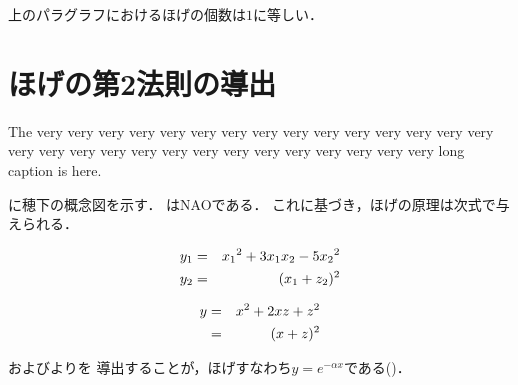 \begin{small}
上のパラグラフにおけるほげの個数は$1$に等しい．
 
 
\section{ほげの第2法則の導出}
 
 
{\baselineskip=9pt The very very very very very very very very very very very very very
very very very very very very very very very very very very very very
very very long caption is here.}
 
に穂下の概念図を示す．
はNAOである．
これに基づき，ほげの原理は次式で与えられる\cite{hooogeBook}．
 
\begin{eqnarray}
\equlabel{hoge1}
y_1 & = & {x_1}^2 + 3x_1x_2 - 5{x_2}^2 \\
\equlabel{hoge2}
y_2 & = & (x_1 + z_2)^2
\end{eqnarray}
 
\begin{eqnarray}
\equlabel{hoge3}
y & = & x^2 + 2xz + z^2 \nonumber\\
  & = & (x + z)^2
\end{eqnarray}
 
 
およびよりを
導出することが，ほげすなわち$y=e^{-\alpha x}$である()．
 
 
 
 
 
 
 
 
{


}
 
\end{small}
